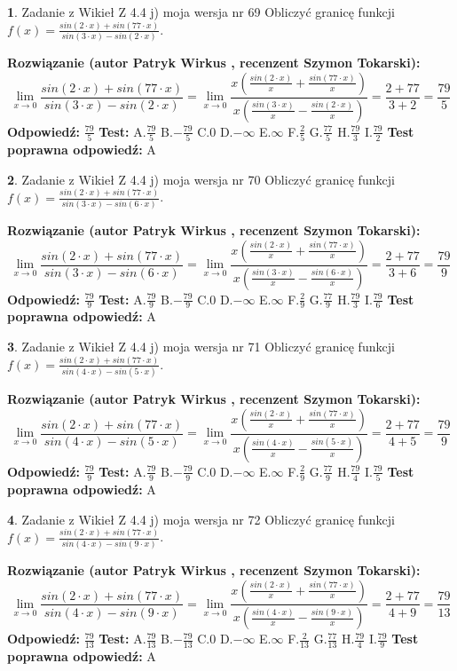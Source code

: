 \documentclass[12pt, a4paper]{article}
\theoremstyle{definition} %
\newtheorem{zad}{}
\newcommand{\zadStart}[1]{\begin{zad}#1\newline}
\newcommand{\zadStop}{\end{zad}}
\newcommand{\rozwStart}[2]{\noindent \textbf{Rozwiązanie (autor #1 , recenzent #2): }\newline}
\newcommand{\rozwStop}{\newline}
\newcommand{\odpStart}{\noindent \textbf{Odpowiedź:}\newline}
\newcommand{\odpStop}{\newline}
\newcommand{\testStart}{\noindent \textbf{Test:}\newline}
\newcommand{\testStop}{\newline}
\newcommand{\kluczStart}{\noindent \textbf{Test poprawna odpowiedź:}\newline}
\newcommand{\kluczStop}{\newline}
\begin{document}
\zadStart{Zadanie z Wikieł Z 4.4 j) moja wersja nr 69}
Obliczyć granicę funkcji $f(x)=\frac{sin(2\cdot x) +sin(77\cdot x)}{sin(3\cdot x) -sin(2\cdot x)}$.
\zadStop
\rozwStart{Patryk Wirkus}{Szymon Tokarski}
$$\lim\limits_{x\to 0}\frac{sin(2\cdot x) +sin(77\cdot x)}{sin(3\cdot x) -sin(2\cdot x)}=\lim\limits_{x\to 0}\frac{x(\frac{sin(2\cdot x)}{x}+\frac{sin(77\cdot x)}{x})}{x(\frac{sin(3\cdot x)}{x}-\frac{sin(2\cdot x)}{x})}=\frac{2+77}{3+2} = \frac{79}{5}$$
\rozwStop
\odpStart
$\frac{79}{5}$
\odpStop
\testStart
A.$\frac{79}{5}$
B.$-\frac{79}{5}$
C.$0$
D.$-\infty$
E.$\infty$
F.$\frac{2}{5}$
G.$\frac{77}{5}$
H.$\frac{79}{3}$
I.$\frac{79}{2}$
\testStop
\kluczStart
A
\kluczStop



\zadStart{Zadanie z Wikieł Z 4.4 j) moja wersja nr 70}
Obliczyć granicę funkcji $f(x)=\frac{sin(2\cdot x) +sin(77\cdot x)}{sin(3\cdot x) -sin(6\cdot x)}$.
\zadStop
\rozwStart{Patryk Wirkus}{Szymon Tokarski}
$$\lim\limits_{x\to 0}\frac{sin(2\cdot x) +sin(77\cdot x)}{sin(3\cdot x) -sin(6\cdot x)}=\lim\limits_{x\to 0}\frac{x(\frac{sin(2\cdot x)}{x}+\frac{sin(77\cdot x)}{x})}{x(\frac{sin(3\cdot x)}{x}-\frac{sin(6\cdot x)}{x})}=\frac{2+77}{3+6} = \frac{79}{9}$$
\rozwStop
\odpStart
$\frac{79}{9}$
\odpStop
\testStart
A.$\frac{79}{9}$
B.$-\frac{79}{9}$
C.$0$
D.$-\infty$
E.$\infty$
F.$\frac{2}{9}$
G.$\frac{77}{9}$
H.$\frac{79}{3}$
I.$\frac{79}{6}$
\testStop
\kluczStart
A
\kluczStop



\zadStart{Zadanie z Wikieł Z 4.4 j) moja wersja nr 71}
Obliczyć granicę funkcji $f(x)=\frac{sin(2\cdot x) +sin(77\cdot x)}{sin(4\cdot x) -sin(5\cdot x)}$.
\zadStop
\rozwStart{Patryk Wirkus}{Szymon Tokarski}
$$\lim\limits_{x\to 0}\frac{sin(2\cdot x) +sin(77\cdot x)}{sin(4\cdot x) -sin(5\cdot x)}=\lim\limits_{x\to 0}\frac{x(\frac{sin(2\cdot x)}{x}+\frac{sin(77\cdot x)}{x})}{x(\frac{sin(4\cdot x)}{x}-\frac{sin(5\cdot x)}{x})}=\frac{2+77}{4+5} = \frac{79}{9}$$
\rozwStop
\odpStart
$\frac{79}{9}$
\odpStop
\testStart
A.$\frac{79}{9}$
B.$-\frac{79}{9}$
C.$0$
D.$-\infty$
E.$\infty$
F.$\frac{2}{9}$
G.$\frac{77}{9}$
H.$\frac{79}{4}$
I.$\frac{79}{5}$
\testStop
\kluczStart
A
\kluczStop



\zadStart{Zadanie z Wikieł Z 4.4 j) moja wersja nr 72}
Obliczyć granicę funkcji $f(x)=\frac{sin(2\cdot x) +sin(77\cdot x)}{sin(4\cdot x) -sin(9\cdot x)}$.
\zadStop
\rozwStart{Patryk Wirkus}{Szymon Tokarski}
$$\lim\limits_{x\to 0}\frac{sin(2\cdot x) +sin(77\cdot x)}{sin(4\cdot x) -sin(9\cdot x)}=\lim\limits_{x\to 0}\frac{x(\frac{sin(2\cdot x)}{x}+\frac{sin(77\cdot x)}{x})}{x(\frac{sin(4\cdot x)}{x}-\frac{sin(9\cdot x)}{x})}=\frac{2+77}{4+9} = \frac{79}{13}$$
\rozwStop
\odpStart
$\frac{79}{13}$
\odpStop
\testStart
A.$\frac{79}{13}$
B.$-\frac{79}{13}$
C.$0$
D.$-\infty$
E.$\infty$
F.$\frac{2}{13}$
G.$\frac{77}{13}$
H.$\frac{79}{4}$
I.$\frac{79}{9}$
\testStop
\kluczStart
A
\kluczStop
\end{document}
